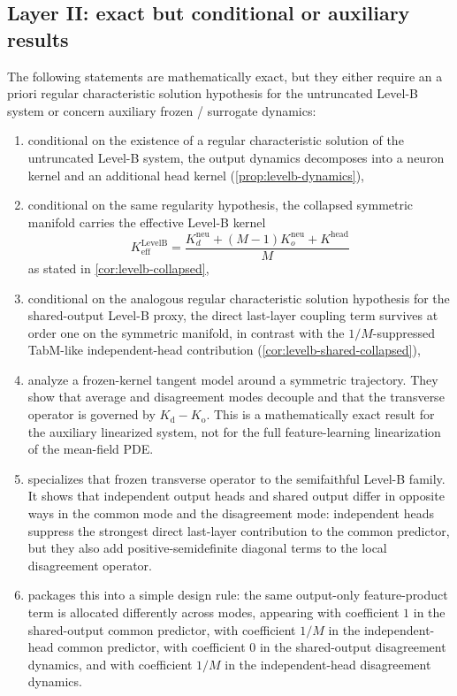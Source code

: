 \documentclass[11pt]{article}
\theoremstyle{definition}
\begin{document}
\subsection{Layer II: exact but conditional or auxiliary results}

The following statements are mathematically exact, but they either require an a priori regular characteristic solution hypothesis for the untruncated Level-B system or concern auxiliary frozen / surrogate dynamics:
\begin{enumerate}[leftmargin=2em]
  \item conditional on the existence of a regular characteristic solution of the untruncated Level-B system, the output dynamics decomposes into a neuron kernel and an additional head kernel (\cref{prop:levelb-dynamics}),
  \item conditional on the same regularity hypothesis, the collapsed symmetric manifold carries the effective Level-B kernel
  \[
    K_{\mathrm{eff}}^{\mathrm{LevelB}}
    =
    \frac{
      K_d^{\mathrm{neu}}+(M-1)K_o^{\mathrm{neu}}+K^{\mathrm{head}}
    }{M}
  \]
  as stated in \cref{cor:levelb-collapsed},
  \item conditional on the analogous regular characteristic solution hypothesis for the shared-output Level-B proxy, the direct last-layer coupling term survives at order one on the symmetric manifold, in contrast with the $1/M$-suppressed TabM-like independent-head contribution (\cref{cor:levelb-shared-collapsed}),
  \item {} analyze a frozen-kernel tangent model around a symmetric trajectory.
  They show that average and disagreement modes decouple and that the transverse operator is governed by $K_{\mathrm d}-K_{\mathrm o}$.
  This is a mathematically exact result for the auxiliary linearized system, not for the full feature-learning linearization of the mean-field PDE.
  \item {} specializes that frozen transverse operator to the semifaithful Level-B family.
  It shows that independent output heads and shared output differ in opposite ways in the common mode and the disagreement mode:
  independent heads suppress the strongest direct last-layer contribution to the common predictor, but they also add positive-semidefinite diagonal terms to the local disagreement operator.
  \item {} packages this into a simple design rule:
  the same output-only feature-product term is allocated differently across modes, appearing with coefficient $1$ in the shared-output common predictor, with coefficient $1/M$ in the independent-head common predictor, with coefficient $0$ in the shared-output disagreement dynamics, and with coefficient $1/M$ in the independent-head disagreement dynamics.

\end{enumerate}
\end{document}
